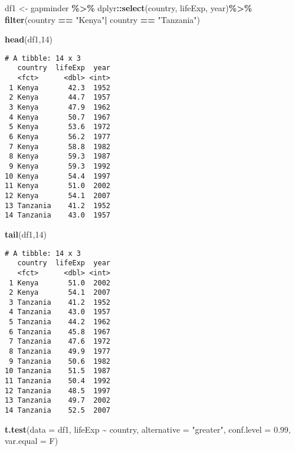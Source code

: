 \documentclass[
]{article}
\newenvironment{Shaded}{\begin{snugshade}}{\end{snugshade}}
\newcommand{\AttributeTok}[1]{\textcolor[rgb]{0.13,0.29,0.53}{#1}}
\newcommand{\DecValTok}[1]{\textcolor[rgb]{0.00,0.00,0.81}{#1}}
\newcommand{\FloatTok}[1]{\textcolor[rgb]{0.00,0.00,0.81}{#1}}
\newcommand{\FunctionTok}[1]{\textcolor[rgb]{0.13,0.29,0.53}{\textbf{#1}}}
\newcommand{\NormalTok}[1]{#1}
\newcommand{\OtherTok}[1]{\textcolor[rgb]{0.56,0.35,0.01}{#1}}
\newcommand{\SpecialCharTok}[1]{\textcolor[rgb]{0.81,0.36,0.00}{\textbf{#1}}}
\newcommand{\StringTok}[1]{\textcolor[rgb]{0.31,0.60,0.02}{#1}}
\begin{document}
\begin{Shaded}
\begin{Highlighting}[]
\NormalTok{df1 }\OtherTok{\textless{}{-}}\NormalTok{ gapminder }\SpecialCharTok{\%\textgreater{}\%}
\NormalTok{  dplyr}\SpecialCharTok{::}\FunctionTok{select}\NormalTok{(country, lifeExp, year)}\SpecialCharTok{\%\textgreater{}\%}
  \FunctionTok{filter}\NormalTok{(country }\SpecialCharTok{==} \StringTok{"Kenya"}\SpecialCharTok{|}
\NormalTok{           country }\SpecialCharTok{==} \StringTok{"Tanzania"}\NormalTok{)}

\FunctionTok{head}\NormalTok{(df1,}\DecValTok{14}\NormalTok{)}
\end{Highlighting}
\end{Shaded}

\begin{verbatim}
# A tibble: 14 x 3
   country  lifeExp  year
   <fct>      <dbl> <int>
 1 Kenya       42.3  1952
 2 Kenya       44.7  1957
 3 Kenya       47.9  1962
 4 Kenya       50.7  1967
 5 Kenya       53.6  1972
 6 Kenya       56.2  1977
 7 Kenya       58.8  1982
 8 Kenya       59.3  1987
 9 Kenya       59.3  1992
10 Kenya       54.4  1997
11 Kenya       51.0  2002
12 Kenya       54.1  2007
13 Tanzania    41.2  1952
14 Tanzania    43.0  1957
\end{verbatim}

\begin{Shaded}
\begin{Highlighting}[]
\FunctionTok{tail}\NormalTok{(df1,}\DecValTok{14}\NormalTok{)}
\end{Highlighting}
\end{Shaded}

\begin{verbatim}
# A tibble: 14 x 3
   country  lifeExp  year
   <fct>      <dbl> <int>
 1 Kenya       51.0  2002
 2 Kenya       54.1  2007
 3 Tanzania    41.2  1952
 4 Tanzania    43.0  1957
 5 Tanzania    44.2  1962
 6 Tanzania    45.8  1967
 7 Tanzania    47.6  1972
 8 Tanzania    49.9  1977
 9 Tanzania    50.6  1982
10 Tanzania    51.5  1987
11 Tanzania    50.4  1992
12 Tanzania    48.5  1997
13 Tanzania    49.7  2002
14 Tanzania    52.5  2007
\end{verbatim}

\begin{Shaded}
\begin{Highlighting}[]
\FunctionTok{t.test}\NormalTok{(}\AttributeTok{data =}\NormalTok{ df1, lifeExp }\SpecialCharTok{\textasciitilde{}}\NormalTok{ country, }\AttributeTok{alternative =} \StringTok{"greater"}\NormalTok{, }\AttributeTok{conf.level =} \FloatTok{0.99}\NormalTok{, }\AttributeTok{var.equal =}\NormalTok{ F)}
\end{Highlighting}
\end{Shaded}
\end{document}
